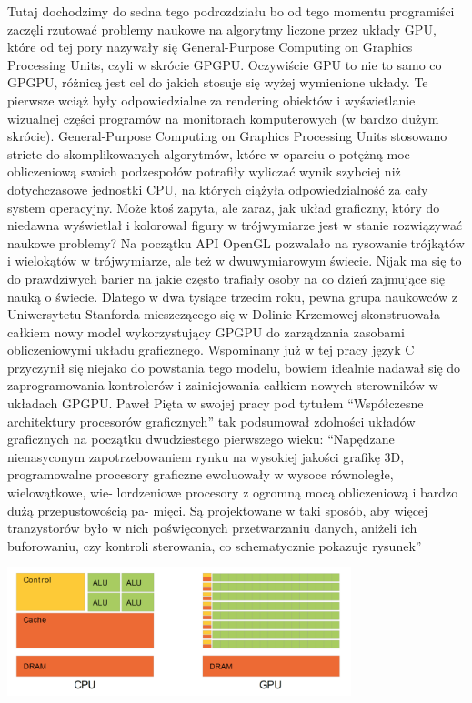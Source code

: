 \documentclass{article}
\begin{document}
\par
Tutaj dochodzimy do sedna tego podrozdziału bo od tego momentu programiści zaczęli rzutować problemy naukowe na algorytmy liczone przez układy GPU, które od tej pory nazywały się General-Purpose Computing on Graphics Processing Units, czyli w skrócie GPGPU. Oczywiście GPU to nie to samo co GPGPU, różnicą jest cel do jakich stosuje się wyżej wymienione układy. Te pierwsze wciąż były odpowiedzialne za rendering obiektów i wyświetlanie wizualnej części programów na monitorach komputerowych (w bardzo dużym skrócie). General-Purpose Computing on Graphics Processing Units stosowano stricte do skomplikowanych algorytmów, które w oparciu o potężną moc obliczeniową swoich podzespołów potrafiły wyliczać wynik szybciej niż dotychczasowe jednostki CPU, na których ciążyła odpowiedzialność za cały system operacyjny. Może ktoś zapyta, ale zaraz, jak układ graficzny, który do niedawna wyświetlał i kolorował figury w trójwymiarze jest w stanie rozwiązywać naukowe problemy? Na początku API OpenGL pozwalało na rysowanie trójkątów i wielokątów w trójwymiarze, ale też w dwuwymiarowym świecie. Nijak ma się to do prawdziwych barier na jakie często trafiały osoby na co dzień zajmujące się nauką o świecie. Dlatego w dwa tysiące trzecim roku, pewna grupa naukowców z Uniwersytetu Stanforda mieszczącego się w Dolinie Krzemowej skonstruowała całkiem nowy model wykorzystujący GPGPU do zarządzania zasobami obliczeniowymi układu graficznego. Wspominany już w tej pracy język C przyczynił się niejako do powstania tego modelu, bowiem idealnie nadawał się do zaprogramowania kontrolerów i zainicjowania całkiem nowych sterowników w układach GPGPU. Paweł Pięta w swojej pracy pod tytułem “Współczesne architektury procesorów graficznych” tak podsumował zdolności układów graficznych na początku dwudziestego pierwszego wieku: “Napędzane nienasyconym zapotrzebowaniem rynku na wysokiej jakości grafikę 3D, programowalne procesory graficzne ewoluowały w wysoce równoległe, wielowątkowe, wie- lordzeniowe procesory z ogromną mocą obliczeniową i bardzo dużą przepustowością pa- mięci. Są projektowane w taki sposób, aby więcej tranzystorów było w nich poświęconych przetwarzaniu danych, aniżeli ich buforowaniu, czy kontroli sterowania, co schematycznie pokazuje rysunek”
\begin{center}
	\includegraphics[width=10cm]{simd}
\end{center}
\end{document}
